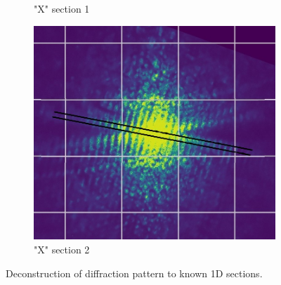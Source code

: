 \begin{figure}[H]
\begin{subfigure}{0.46\columnwidth}
        \caption{"X" section 1}
        \label{fig:HelixSection3}
    \end{subfigure}
    \begin{subfigure}{0.48\columnwidth}
        \centering
        \includegraphics[width=\columnwidth]{figures/HelixSection3.jpg} %
        \caption{"X" section 2}
        \label{fig:HelixSection4}
    \end{subfigure}
    \caption{Deconstruction of diffraction pattern to known 1D sections.}
    \label{fig:HelixSections}
\end{figure}